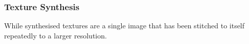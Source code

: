 \documentclass{beamer}
\begin{document}
\begin{frame}
   \frametitle{Texture Synthesis}
   While synthesised textures are a single image that has been stitched to itself repeatedly to a larger resolution.
   \pause
   \begin{figure}[!htbp]
   \begin{center}
   \\

\end{center}
\end{figure}
\end{frame}
\end{document}
